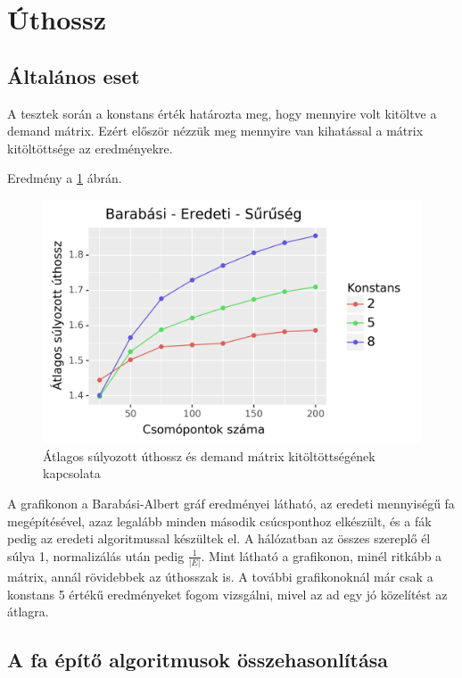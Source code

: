 \documentclass[12pt]{report}
\begin{document}
\section{Úthossz}

\subsection{Általános eset}

A tesztek során a konstans érték határozta meg, hogy mennyire volt kitöltve a demand mátrix.
Ezért először nézzük meg mennyire van kihatással a mátrix kitöltöttsége az eredményekre.

Eredmény a \ref{density-len} ábrán.

\begin{figure}[H]
	\begin{center}
		\includegraphics[width=0.9\linewidth]{pictures/density_len.png}
		\caption{Átlagos súlyozott úthossz és demand mátrix kitöltöttségének kapcsolata}
		\label{density-len}
	\end{center}
\end{figure}

A grafikonon a Barabási-Albert gráf eredményei látható, az eredeti mennyiségű fa megépítésével, azaz legalább minden második csúcsponthoz elkészült, és a fák pedig az eredeti algoritmussal készültek el.
A hálózatban az összes szereplő él súlya 1, normalizálás után pedig
\(\frac{1}{|E|}\).
Mint látható a grafikonon, minél ritkább a mátrix, annál rövidebbek az úthosszak is.
A további grafikonoknál már csak a konstans 5 értékű eredményeket fogom vizsgálni, mivel az ad egy jó közelítést az átlagra.

\subsection{A fa építő algoritmusok összehasonlítása}
\end{document}
